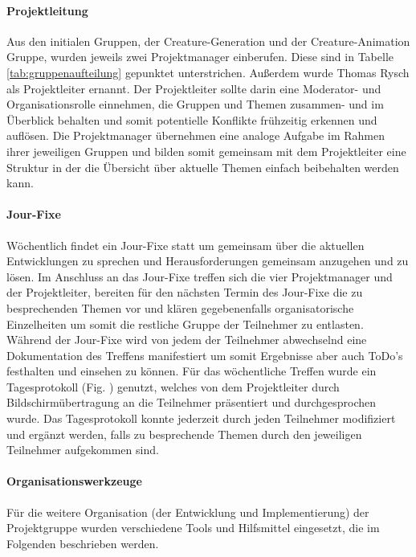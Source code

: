 \paragraph{Projektleitung}
Aus den initialen Gruppen, der Creature-Generation und der Creature-Animation Gruppe, wurden jeweils zwei Projektmanager einberufen. Diese sind in Tabelle \ref{tab:gruppenaufteilung} gepunktet unterstrichen. Außerdem wurde Thomas Rysch als Projektleiter ernannt. Der Projektleiter sollte darin eine Moderator- und Organisationsrolle einnehmen, die Gruppen und Themen zusammen- und im Überblick behalten und somit potentielle Konflikte frühzeitig erkennen und auflösen. Die Projektmanager übernehmen eine analoge Aufgabe im Rahmen ihrer jeweiligen Gruppen und bilden somit gemeinsam mit dem Projektleiter eine Struktur in der die Übersicht über aktuelle Themen einfach beibehalten werden kann.

\paragraph{Jour-Fixe}
Wöchentlich findet ein Jour-Fixe statt um gemeinsam über die aktuellen Entwicklungen zu sprechen und Herausforderungen gemeinsam anzugehen und zu lösen. Im Anschluss an das Jour-Fixe treffen sich die vier Projektmanager und der Projektleiter, bereiten für den nächsten Termin des Jour-Fixe die zu besprechenden Themen vor und klären gegebenenfalls organisatorische Einzelheiten um somit die restliche Gruppe der Teilnehmer zu entlasten. Während der Jour-Fixe wird von jedem der Teilnehmer abwechselnd eine Dokumentation des Treffens manifestiert um somit Ergebnisse aber auch ToDo's festhalten und einsehen zu können. Für das wöchentliche Treffen wurde ein Tagesprotokoll (Fig. ) genutzt, welches von dem Projektleiter durch Bildschirmübertragung an die Teilnehmer präsentiert und durchgesprochen wurde. Das Tagesprotokoll konnte jederzeit durch jeden Teilnehmer modifiziert und ergänzt werden, falls zu besprechende Themen durch den jeweiligen Teilnehmer aufgekommen sind.

\paragraph{Organisationswerkzeuge}
Für die weitere Organisation (der Entwicklung und Implementierung) der Projektgruppe wurden verschiedene Tools und Hilfsmittel eingesetzt, die im Folgenden beschrieben werden.

